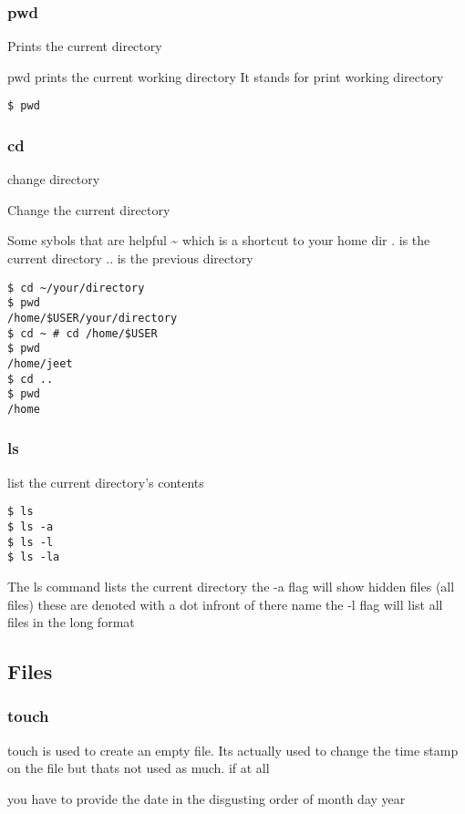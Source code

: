 \documentclass[a4paper]{article}
\begin{document}
\subsubsection*{pwd}
\label{sec:orge814c84}
Prints the current directory
\begin{notes}
	pwd prints the current working directory
	It stands for print working directory
\end{notes}
\begin{verbatim}
$ pwd
\end{verbatim}
\subsubsection*{cd}
\label{sec:org5142c60}
change directory
\begin{notes}
	Change the current directory

	Some sybols that are helpful
	\textasciitilde{} which is a shortcut to your home dir
	. is the current directory
	.. is the previous directory
\end{notes}

\begin{verbatim}
$ cd ~/your/directory
$ pwd
/home/$USER/your/directory
$ cd ~ # cd /home/$USER
$ pwd
/home/jeet
$ cd ..
$ pwd
/home
\end{verbatim}

\subsubsection*{ls}
\label{sec:org4d2b9af}
list the current directory's contents
\begin{verbatim}
$ ls
$ ls -a
$ ls -l
$ ls -la
\end{verbatim}

\begin{notes}
	The ls command lists the current directory
	the -a flag will show hidden files (all files)
	these are denoted with a dot infront of there name
	the -l flag will list all files in the long format
\end{notes}
\subsection*{Files}
\label{sec:org2b3e2c6}
\subsubsection*{touch}
\label{sec:org281b4f8}
\begin{notes}
	touch is used to create an empty file. Its actually used to change the time
	stamp on the file but thats not used as much. if at all

	you have to provide the date in the disgusting order of month day year
\end{notes}
\end{document}
